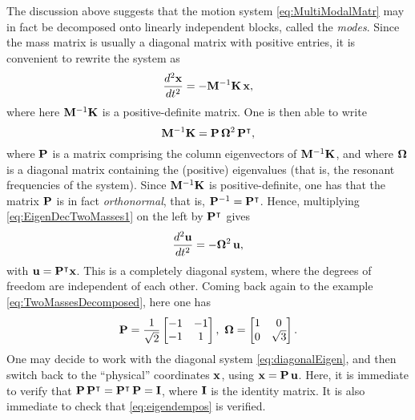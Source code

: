 The discussion above suggests that the motion system \eqref{eq:MultiModalMatr} may in fact be decomposed onto linearly independent blocks, called the \emph{modes}.  Since the mass matrix is usually a diagonal matrix with positive entries, it is convenient to rewrite the system as
\begin{equation}\label{eq:EigenDecTwoMasses1}
\frac{d^2{\bf x}}{dt^2} = -{ \bf M}^{-1}{\bf K} \, {\bf x}, 
\end{equation}
where here ${{\bf M}^{-1}\bf K}$ is a positive-definite matrix. One is then able to write
\begin{equation}\label{eq:eigendempos}
{\bf M}^{-1}{\bf K} = {\bf P} \, {\bf \Omega}^2 \, {\bf P}^{\intercal},
\end{equation}
where ${\bf P}$ is a matrix comprising the column eigenvectors of ${\bf M}^{-1}{\bf K}$, and where ${\bf \Omega}$ is a diagonal matrix containing the (positive) eigenvalues (that is, the resonant frequencies of the system). Since ${\bf M}^{-1}{\bf K}$ is positive-definite, one has that the matrix ${\bf P}$ is in fact \emph{orthonormal}, that is, ${\bf P}^{-1}={\bf P}^\intercal$. Hence, multiplying \eqref{eq:EigenDecTwoMasses1} on the left by ${\bf P}^\intercal$ gives
\begin{equation}\label{eq:diagonalEigen}
\frac{d^2{\bf u}}{dt^2} = -{\bf \Omega}^2 \, {\bf u}, 
\end{equation}
with ${\bf u} = {\bf P}^{\intercal}{\bf x}$. This is a completely diagonal system, where the  degrees of freedom are independent of each other. Coming back again to the example \eqref{eq:TwoMassesDecomposed}, here one has
\begin{equation}
{\bf P} =  \frac{1}{\sqrt{2}}\begin{bmatrix}-1 & -1 \\ -1 & 1 \end{bmatrix}, \,\, {\bf \Omega} =  \begin{bmatrix}1 & 0 \\ 0 & \sqrt{3} \end{bmatrix}.
\end{equation}
One may decide to work with the diagonal system \eqref{eq:diagonalEigen}, and then switch back to the ``physical'' coordinates $\bf x$, using ${\bf x} = {\bf P}\,{\bf u}$. Here, it is immediate to verify that ${\bf P} \, {\bf P}^{\intercal} = {\bf P}^\intercal \, {\bf P} = {\bf I}$, where ${\bf I}$ is the identity matrix. It is also immediate to check that \eqref{eq:eigendempos} is verified. 




